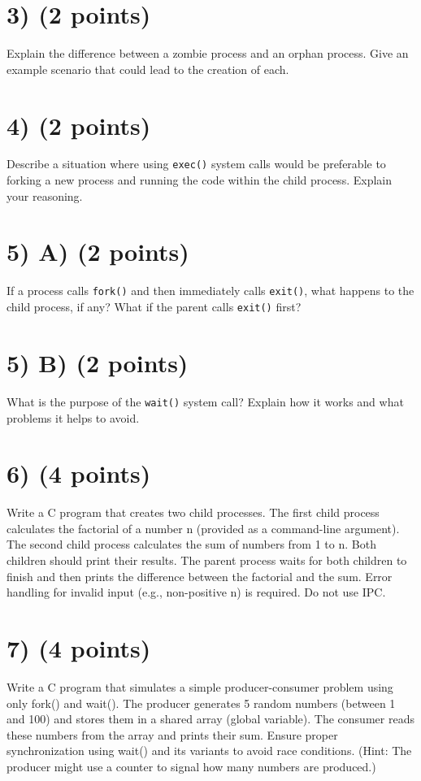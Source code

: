 \documentclass{article}
\begin{document}
\section*{3) (2 points)}
Explain the difference between a zombie process and an orphan process.  Give an example scenario that could lead to the creation of each.

\section*{4) (2 points)}
Describe a situation where using \texttt{exec()} system calls would be preferable to forking a new process and running the code within the child process. Explain your reasoning.

\section*{5) A) (2 points)}
If a process calls \texttt{fork()} and then immediately calls \texttt{exit()}, what happens to the child process, if any?  What if the parent calls \texttt{exit()} first?

\section*{5) B) (2 points)}
What is the purpose of the \texttt{wait()} system call? Explain how it works and what problems it helps to avoid.

\section*{6) (4 points)}
Write a C program that creates two child processes. The first child process calculates the factorial of a number n (provided as a command-line argument). The second child process calculates the sum of numbers from 1 to n.  Both children should print their results. The parent process waits for both children to finish and then prints the difference between the factorial and the sum.  Error handling for invalid input (e.g., non-positive n) is required.  Do not use IPC.

\section*{7) (4 points)}
Write a C program that simulates a simple producer-consumer problem using only fork() and wait(). The producer generates 5 random numbers (between 1 and 100) and stores them in a shared array (global variable). The consumer reads these numbers from the array and prints their sum. Ensure proper synchronization using wait() and its variants to avoid race conditions.  (Hint: The producer might use a counter to signal how many numbers are produced.)
\end{document}
